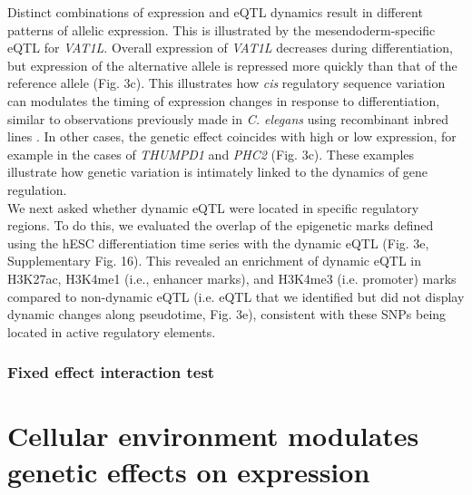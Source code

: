 Distinct combinations of expression and eQTL dynamics result in different patterns of allelic expression. 
This is illustrated by the mesendoderm-specific eQTL for \textit{VAT1L}. 
Overall expression of \textit{VAT1L} decreases during differentiation, but expression of the alternative allele is repressed more quickly than that of the reference allele (Fig. 3c). 
This illustrates how \textit{cis} regulatory sequence variation can modulates the timing of expression changes in response to differentiation, similar to observations previously made in \textit{C. elegans} using recombinant inbred lines \cite{francesconi2014effects}. 
In other cases, the genetic effect coincides with high or low expression, for example in the cases of \textit{THUMPD1} and \textit{PHC2} (Fig. 3c). 
These examples illustrate how genetic variation is intimately linked to the dynamics of gene regulation.\\

We next asked whether dynamic eQTL were located in specific regulatory regions. 
To do this, we evaluated the overlap of the epigenetic marks defined using the hESC differentiation time series with the dynamic eQTL (Fig. 3e, Supplementary Fig. 16). 
This revealed an enrichment of dynamic eQTL in H3K27ac, H3K4me1 (i.e., enhancer marks), and H3K4me3 (i.e. promoter) marks compared to non-dynamic eQTL (i.e. eQTL that we identified but did not display dynamic changes along pseudotime, Fig. 3e), consistent with these SNPs being located in active regulatory elements.

\vspace{5mm}

\subsubsection{Fixed effect interaction test}



\section{Cellular environment modulates genetic effects on expression}

